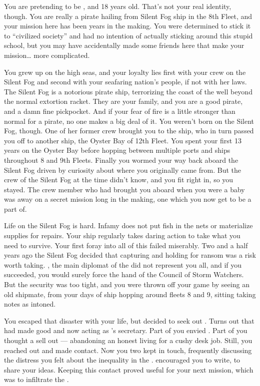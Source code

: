 \documentclass[char]{GL2020}
\begin{document}
\name{\cPirateChild{}}

You are pretending to be \cPirateChild{\intro}, and 18 years old. That's not your real identity, though. You are really a \pShippie{} pirate hailing from Silent Fog ship in the 8th Fleet, and your mission here has been years in the making. You were determined to stick it to ``civilized society'' and had no intention of actually sticking around this stupid school, but you may have accidentally made some friends here that make your mission\ldots{} more complicated.

You grew up on the high seas, and your loyalty lies first with your crew on the Silent Fog and second with your seafaring nation's people, if not with her laws. The Silent Fog is a notorious pirate ship, terrorizing the coast of the \pFarm{} well beyond the normal extortion racket. They are your family, and you are a good pirate, and a damn fine pickpocket. And if your fear of fire is a little stronger than normal for a pirate, no one makes a big deal of it. You weren't born on the Silent Fog, though. One of her former crew brought you to the ship, who in turn passed you off to another ship, the Oyster Bay of 12th Fleet. You spent your first 13 years on the Oyster Bay before hopping between multiple ports and ships throughout 8 and 9th Fleets. Finally you wormed your way back aboard the Silent Fog driven by curiosity about where you originally came from. But the crew of the Silent Fog at the time didn't know, and you fit right in, so you stayed. The crew member who had brought you aboard when you were a baby was away on a secret mission long in the making, one which you now get to be a part of.

Life on the Silent Fog is hard. Infamy does not put fish in the nets or materialize supplies for repairs. Your ship regularly takes daring action to take what you need to survive. Your first foray into all of this failed miserably. Two and a half years ago the Silent Fog decided that capturing and holding \cHeadDiplomat{\full} for ransom was a risk worth taking. \cHeadDiplomat{}, the main diplomat of the \pShippies{} did not represent you all, and if you succeeded, you would surely force the hand of the Council of Storm Watchers. But the security was too tight, and you were thrown off your game by seeing an old shipmate, from your days of ship hopping around fleets 8 and 9, sitting taking notes as \cHeadDiplomat{} intoned. 

You escaped that disaster with your life, but decided to seek out \cChupLeader{\full}. Turns out that \cChupLeader{\they} had made good and now \cChupLeader{\were} acting as \cHeadDiplomat{}’s secretary. Part of you envied \cChupLeader{\them}. Part of you thought \cChupLeader{\them} a sell out — abandoning an honest living for a cushy desk job. Still, you reached out and made contact. Now you two kept in touch, frequently discussing the distress you felt about the inequality in the \pShip{}. \cChupLeader{} encouraged you to write, to share your ideas. Keeping this contact proved useful for your next mission, which was to infiltrate the \pSchool{}. 
\end{document}
